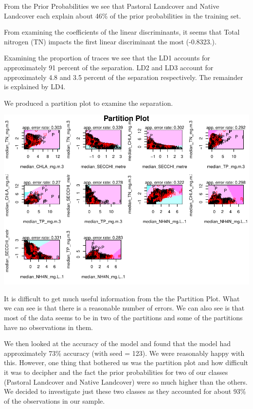 \documentclass[
]{article}
\begin{document}
From the Prior Probabilities we see that Pastoral Landcover and Native Landcover each explain about 46\% of the prior probabilities in the training set.

From examining the coefficients of the linear discriminants, it seems that Total nitrogen (TN) impacts the first linear discriminant the most (-0.8323.).

Examining the proportion of traces we see that the LD1 accounts for approximately 91 percent of the separation. LD2 and LD3 account for approximately 4.8 and 3.5 percent of the separation respectively. The remainder is explained by LD4.

We produced a partition plot to examine the separation.

\includegraphics{Final-Report_files/figure-latex/unnamed-chunk-3-1.pdf}

It is difficult to get much useful information from the the Partition Plot. What we can see is that there is a reasonable number of errors. We can also see is that most of the data seems to be in two of the partitions and some of the partitions have no observations in them.

We then looked at the accuracy of the model and found that the model had approximately 73\% accuracy (with seed = 123). We were reasonably happy with this. However, one thing that bothered us was the partition plot and how difficult it was to decipher and the fact the prior probabilities for two of our classes (Pastoral Landcover and Native Landcover) were so much higher than the others. We decided to investigate just these two classes as they accounted for about 93\% of the observations in our sample.
\end{document}
